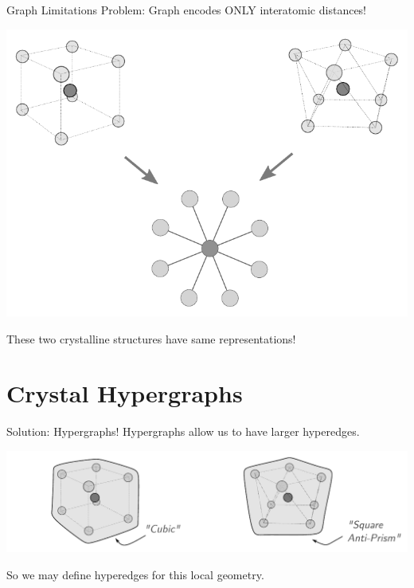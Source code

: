 \documentclass[11pt]{beamer}
\begin{document}
\begin{frame}{Graph Limitations}
Problem: \pause Graph encodes ONLY interatomic distances!\pause

\medskip 

\begin{center}

\includegraphics[scale=0.7]{crystalgraph_cntex.pdf}

\end{center}

These two crystalline structures have same representations!
\end{frame} 

\section{Crystal Hypergraphs}
\begin{frame}{Solution: Hypergraphs!}
Hypergraphs allow us to have larger hyperedges.\pause 

\vspace{.5cm}

\begin{center}
\includegraphics[scale=0.52]{crystalgraph_cntex_3.pdf}
\end{center}

\vspace{.5cm}

So we may define hyperedges for this local geometry.
\end{frame}
\end{document}
